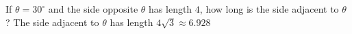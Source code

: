 {If $\theta = 30^{\circ}$ and the side opposite $\theta$ has length $4$, how long is the side adjacent to $\theta$? }
{The side adjacent to $\theta$ has length $4\sqrt{3} \approx 6.928$}
